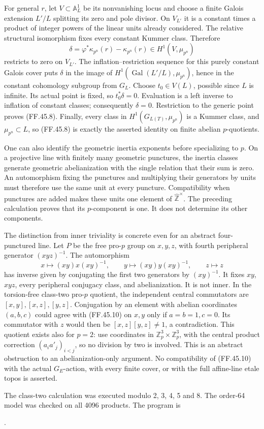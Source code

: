 For general \(r\), let \(V\subset\mathbb A^1_L\)
be its nonvanishing locus and choose a finite Galois
extension \(L'/L\) splitting its zero and pole divisor.
On \(V_{L'}\) it is a constant times a product of
integer powers of the linear units already considered.
The relative structural isomorphism fixes every constant
Kummer class. Therefore
\[
 \delta=\varphi^*\kappa_{p^n}(r)-\kappa_{p^n}(r)
                          \in H^1(V,\mu_{p^n})
\]
restricts to zero on \(V_{L'}\). The
inflation--restriction sequence for this purely constant
Galois cover puts \(\delta\) in the image of
\(H^1(\operatorname{Gal}(L'/L),\mu_{p^n})\), hence
in the constant cohomology subgroup from \(G_L\).
Choose \(t_0\in V(L)\), possible since \(L\) is
infinite. Its actual point is fixed, so
\(t_0^*\delta=0\). Evaluation is a left inverse to
inflation of constant classes; consequently
\(\delta=0\). Restriction to the generic point proves
(FF.45.8). Finally, every class in
\(H^1(G_{L(T)},\mu_{p^n})\) is a Kummer class, and
\(\mu_{p^n}\subset L\), so (FF.45.8) is exactly the
asserted identity on finite abelian \(p\)-quotients.

One can also identify the geometric inertia exponents
before specializing to \(p\). On a projective line with
finitely many geometric punctures, the inertia classes
generate geometric abelianization with the single
relation that their sum is zero. An automorphism fixing
the punctures and multiplying their generators by units
must therefore use the same unit at every puncture.
Compatibility when punctures are added makes these
units one element of \(\widehat{\mathbb Z}^{\times}\).
The preceding calculation proves that its \(p\)-component
is one. It does not determine its other components.

The distinction from inner triviality is concrete even
for an abstract four-punctured line. Let \(P\) be the
free pro-\(p\) group on \(x,y,z\), with fourth
peripheral generator \((xyz)^{-1}\). The automorphism
\[
 x\longmapsto(xy)x(xy)^{-1},\qquad
 y\longmapsto(xy)y(xy)^{-1},\qquad
 z\longmapsto z
                                                        \tag{FF.45.10}
\]
has inverse given by conjugating the first two generators
by \((xy)^{-1}\). It fixes \(xy\), \(xyz\), every
peripheral conjugacy class, and abelianization. It is not
inner. In the torsion-free class-two pro-\(p\) quotient,
the independent central commutators are
\([x,y],[x,z],[y,z]\). Conjugation by an element with
abelian coordinates \((a,b,c)\) could agree with
(FF.45.10) on \(x,y\) only if \(a=b=1,c=0\).
Its commutator with \(z\) would then be
\([x,z][y,z]\ne1\), a contradiction. This quotient
exists also for \(p=2\): use coordinates in
\(\mathbb Z_p^3\times\mathbb Z_p^3\), with the
central product correction
\((a_i a'_j)_{i<j}\), so no division by two is involved.
This is an abstract obstruction to an abelianization-only
argument. No compatibility of (FF.45.10) with the actual
\(G_E\)-action, with every finite cover, or with the
full affine-line etale topos is asserted.

The class-two calculation was executed modulo 2, 3, 4, 5 and 8. The order-64 model was checked on all 4096 products. The program is

.
